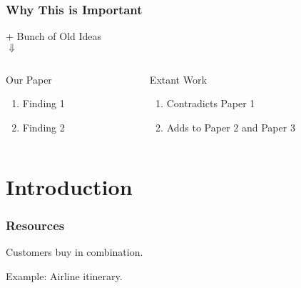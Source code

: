 \documentclass[10pt, mathserif, aspectratio = 169]{beamer}
\begin{document}
\begin{frame}

\frametitle{Why This is Important}

\begin{center}
 + Bunch of Old Ideas \\ \vspace{1em}
$\Downarrow$ \\ \vspace{1em} \pause
{}
\end{center}
\pause
\begin{columns}
\begin{column}{0.45\textwidth}
\begin{block}{\centering Our Paper}
\begin{enumerate}
\item<4-> Finding 1 \vspace{1em}
\item<5-> Finding 2 \vspace{1em}
\end{enumerate}
\end{block}
\end{column}

\begin{column}{0.45\textwidth}
\begin{block}{\centering Extant Work}
\begin{enumerate}
\item<4-> Contradicts Paper 1 \vspace{1em}
\item<5-> Adds to Paper 2 and Paper 3 \vspace{1em}
\end{enumerate}
\end{block}
\end{column}
\end{columns}

\end{frame}


\section{Introduction}

\begin{frame}
\frametitle{Resources}
Customers buy  in combination.

\pause \vspace{2em}

Example: Airline itinerary.

\end{frame}
\end{document}
